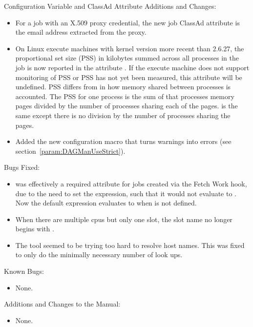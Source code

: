\noindent Configuration Variable and ClassAd Attribute Additions and Changes:

\begin{itemize}

\item For a job with an X.509 proxy credential, the new job ClassAd
attribute  is the email address extracted
from the proxy.

\item On Linux execute machines with kernel version more recent than 2.6.27,
the proportional set size (PSS) in kilobytes summed across all
processes in the job is now reported in the attribute
.  If the execute machine does not
support monitoring of PSS or PSS has not yet been measured, this
attribute will be undefined.  PSS differs from  in
how memory shared between processes is accounted.  The PSS for one
process is the sum of that processes memory pages divided by the
number of processes sharing each of the pages.   is
the same except there is no division by the number of processes
sharing the pages.

\item Added the new  configuration macro
that turns warnings into errors (see section~\ref{param:DAGManUseStrict}).

\end{itemize}

\noindent Bugs Fixed:

\begin{itemize}

\item {} was effectively a required attribute for
  jobs created via the Fetch Work hook,
  due to the need to set the 
  expression, such that it would not evaluate to .
  Now the default  expression
  evaluates to  when  is not defined.

\item When there are multiple cpus but only one slot, the slot name no
longer begins with .

\item The tool  seemed to be trying too hard to resolve
host names. This was fixed to only do the minimally necessary 
number of look ups.

\end{itemize}

\noindent Known Bugs:

\begin{itemize}

\item None.

\end{itemize}

\noindent Additions and Changes to the Manual:

\begin{itemize}

\item None.

\end{itemize}

